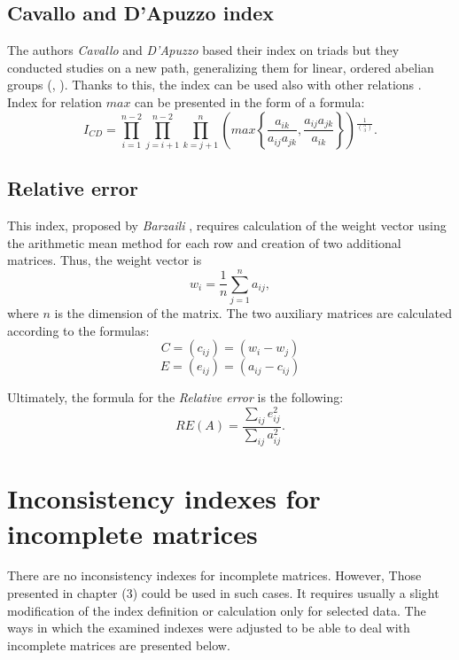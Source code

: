 \subsection{Cavallo and D’Apuzzo index}

The authors \textit{Cavallo} and \textit{D'Apuzzo} based their index on triads but they conducted studies on a new path, generalizing them for linear, ordered abelian groups (\cite{Cavallo2009}, \cite{Cavallo2010}). Thanks to this, the index can be used also with other relations \cite{Brunelli2013}. Index for relation $max$ can be presented in the form of a formula:
	\begin{equation} 
		I_{CD}=\prod_{i=1}^{n-2}\prod_{j=i+1}^{n-2}\prod_{k=j+1}^{n}\left(max\left\{ \frac{a_{ik}}{a_{ij}a_{jk}},\frac{a_{ij}a_{jk}}{a_{ik}}\right\} \right){}^{\frac{1}{\binom{n}{3}}}.
	 \end{equation}
 

\subsection{Relative error}

This index, proposed by \textit{Barzaili} \cite{Jonathan1998}, requires calculation of the weight vector using the arithmetic mean method for each row and creation of two additional matrices. Thus, the weight vector is $$w_{i}=\frac{1}{n}\sum_{j=1}^{n}a_{ij},$$ where $n$ is the dimension of the matrix. The two auxiliary matrices are calculated according to the formulas:
$$C=\left(c_{ij}\right)=\left(w_{i}-w_{j}\right)$$
$$E=\left(e_{ij}\right)=\left(a_{ij}-c_{ij}\right)$$

Ultimately, the formula for the \textit{Relative error} is the following:
	\begin{equation} 
		RE(A)=\frac{\sum_{ij}e_{ij}^{2}}{\sum_{ij}a_{ij}^{2}}.
	 \end{equation}


\section{Inconsistency indexes for incomplete matrices}
\label{sec:inconsistencyIndexesForIncompleteMatrices}

There are no inconsistency indexes for incomplete matrices. However, Those presented in chapter (3) could be used in such cases. It requires usually a slight modification of the index definition or calculation only for selected data. The ways in which the examined indexes were adjusted to be able to deal with incomplete matrices are presented below.

